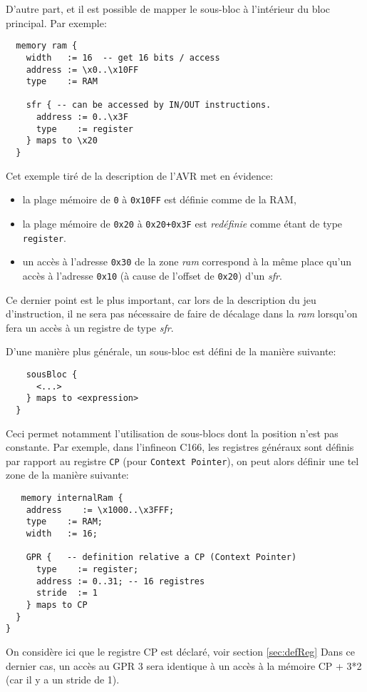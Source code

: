 D'autre part, et il est possible de mapper le sous-bloc à l'intérieur du bloc principal.
Par exemple:
\begin{lstlisting}
  memory ram {
    width   := 16  -- get 16 bits / access
    address := \x0..\x10FF 
    type    := RAM 
   
    sfr { -- can be accessed by IN/OUT instructions.
      address := 0..\x3F 
      type    := register 
    } maps to \x20 
  }
\end{lstlisting}
Cet exemple tiré de la description de l'AVR met en évidence:
\begin{itemize}
\item la plage mémoire de \texttt{0} à \texttt{0x10FF} est définie comme de la RAM,
\item la plage mémoire de \texttt{0x20} à \texttt{0x20+0x3F} est \emph{redéfinie} comme étant de type \texttt{register}.
\item un accès à l'adresse \texttt{0x30} de la zone \emph{ram} correspond à la même place qu'un accès à l'adresse \texttt{0x10} (à cause de l'offset de \texttt{0x20}) d'un \emph{sfr}.
\end{itemize}
Ce dernier point est le plus important, car lors de la description du jeu d'instruction, il ne sera pas nécessaire de faire de décalage dans la \emph{ram} lorsqu'on fera un accès à un registre de type \emph{sfr}.

D'une manière plus générale, un sous-bloc est défini de la manière suivante:
 \begin{lstlisting}
    sousBloc { 
      <...>
    } maps to <expression> 
  }
\end{lstlisting}
Ceci permet notamment l'utilisation de sous-blocs dont la position n'est pas constante. Par exemple, dans l'infineon C166, les registres généraux sont définis par rapport au registre \texttt{CP} (pour \texttt{Context Pointer}), on peut alors définir une tel zone de la manière suivante:
 \begin{lstlisting}
   memory internalRam {
    address    := \x1000..\x3FFF;
    type    := RAM;
    width   := 16;

    GPR {   -- definition relative a CP (Context Pointer)
      type    := register;
      address := 0..31; -- 16 registres
      stride  := 1
    } maps to CP
  }
}
\end{lstlisting}
On considère ici que le registre CP est déclaré, voir section \ref{sec:defReg}
Dans ce dernier cas, un accès au GPR 3 sera identique à un accès à la mémoire CP + 3*2 (car il y a un stride de 1).

